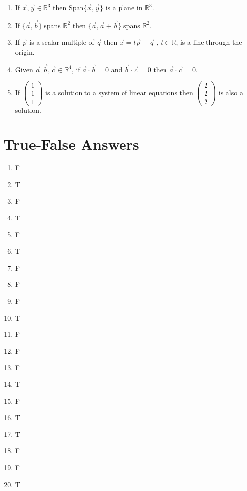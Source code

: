 \documentclass[12pt]{book}
\begin{document}
\begin{enumerate}
\begin{enumerate}
\item If $\vec{x}, \vec{y} \in \mathbb{R}^3$ then $\textrm{Span}\{ \vec{x}, \vec{y}\}$ is a plane in $\mathbb{R}^3$.
\item If $\{ \vec{a}, \vec{b} \}$ spans $\mathbb{R}^2$ then $\{ \vec{a}, \vec{a}+\vec{b} \}$ spans $\mathbb{R}^2$.
\item If $\vec{p}$ is a scalar multiple of $\vec{q}$ then $\vec{x} = t \vec{p} + \vec{q}$ , $t \in \mathbb{R}$, is a line through the origin.
\item Given $\vec{a}, \vec{b}, \vec{c} \in \mathbb{R}^4$, if $\vec{a} \cdot \vec{b} = 0$ and $\vec{b} \cdot \vec{c} = 0$ then $\vec{a} \cdot \vec{c} = 0$. 
\item If $\left(\begin{smallmatrix} 1 \\ 1 \\ 1 \end{smallmatrix}\right)$ is a solution to a system of linear equations then $\left(\begin{smallmatrix} 2 \\ 2 \\ 2 \end{smallmatrix}\right)$ is also a solution. 
\end{enumerate}

\newpage

\section*{True-False Answers}

\begin{enumerate}
\item F 
\item T
\item F
\item T
\item F
\item T
\item F
\item F
\item F
\item T
\item F
\item F
\item F
\item T
\item F
\item T
\item T
\item F
\item F
\item T
\end{enumerate}


\end{enumerate}
\end{document}
